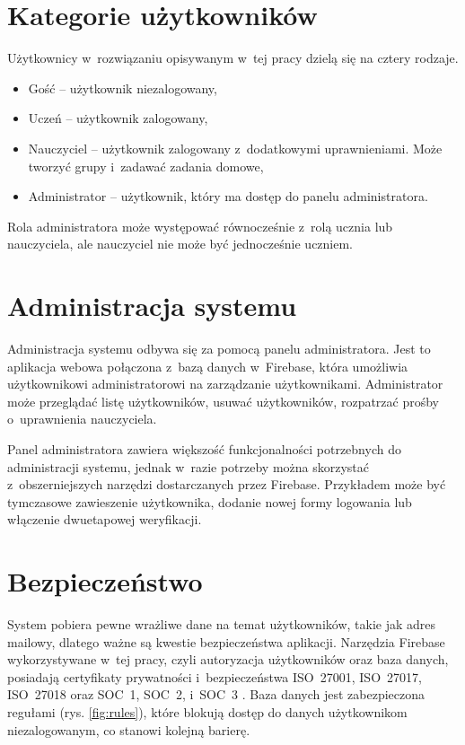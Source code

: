 \documentclass[a4paper,twoside,12pt]{book}
\begin{document}

\section{Kategorie użytkowników}

Użytkownicy w~rozwiązaniu opisywanym w~tej pracy dzielą się na cztery rodzaje. 
\begin{itemize}
\item Gość -- użytkownik niezalogowany,
\item Uczeń -- użytkownik zalogowany,
\item Nauczyciel -- użytkownik zalogowany z~dodatkowymi uprawnieniami. Może tworzyć grupy i~zadawać zadania domowe,
\item Administrator -- użytkownik, który ma dostęp do panelu administratora.
\end{itemize}
Rola administratora może występować równocześnie z~rolą ucznia lub nauczyciela, ale nauczyciel nie może być jednocześnie uczniem.


\section{Administracja systemu}

Administracja systemu odbywa się za pomocą panelu administratora. Jest to aplikacja webowa połączona z~bazą danych w~Firebase, która umożliwia użytkownikowi  administratorowi na zarządzanie użytkownikami. Administrator może przeglądać listę użytkowników, usuwać użytkowników, rozpatrzać prośby o~uprawnienia nauczyciela. 

Panel administratora zawiera większość funkcjonalności potrzebnych do administracji systemu, jednak w~razie potrzeby można skorzystać z~obszerniejszych narzędzi dostarczanych przez Firebase. Przykładem może być tymczasowe zawieszenie użytkownika, dodanie nowej formy logowania lub włączenie dwuetapowej weryfikacji.

\section{Bezpieczeństwo}

System pobiera pewne wrażliwe dane na temat użytkowników, takie jak adres mailowy, dlatego ważne są kwestie bezpieczeństwa aplikacji. Narzędzia Firebase wykorzystywane w~tej pracy, czyli autoryzacja użytkowników oraz baza danych, posiadają certyfikaty prywatności i~bezpieczeństwa ISO~27001, ISO~27017, ISO~27018 oraz SOC~1, SOC~2, i~SOC~3 \cite{bib:privacy}. 
Baza danych jest zabezpieczona regułami (rys. \ref{fig:rules}), które blokują dostęp do danych użytkownikom niezalogowanym, co stanowi kolejną barierę.
\end{document}
